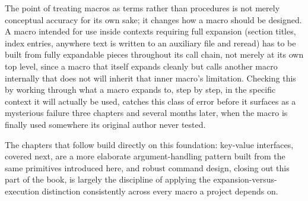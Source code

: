 The point of treating macros as terms rather than procedures is not merely conceptual accuracy for its own sake; it changes how a macro should be designed. A macro intended for use inside contexts requiring full expansion (section titles, index entries, anywhere text is written to an auxiliary file and reread) has to be built from fully expandable pieces throughout its call chain, not merely at its own top level, since a macro that itself expands cleanly but calls another macro internally that does not will inherit that inner macro's limitation. Checking this by working through what a macro expands to, step by step, in the specific context it will actually be used, catches this class of error before it surfaces as a mysterious failure three chapters and several months later, when the macro is finally used somewhere its original author never tested.

The chapters that follow build directly on this foundation: key-value interfaces, covered next, are a more elaborate argument-handling pattern built from the same primitives introduced here, and robust command design, closing out this part of the book, is largely the discipline of applying the expansion-versus-execution distinction consistently across every macro a project depends on.
